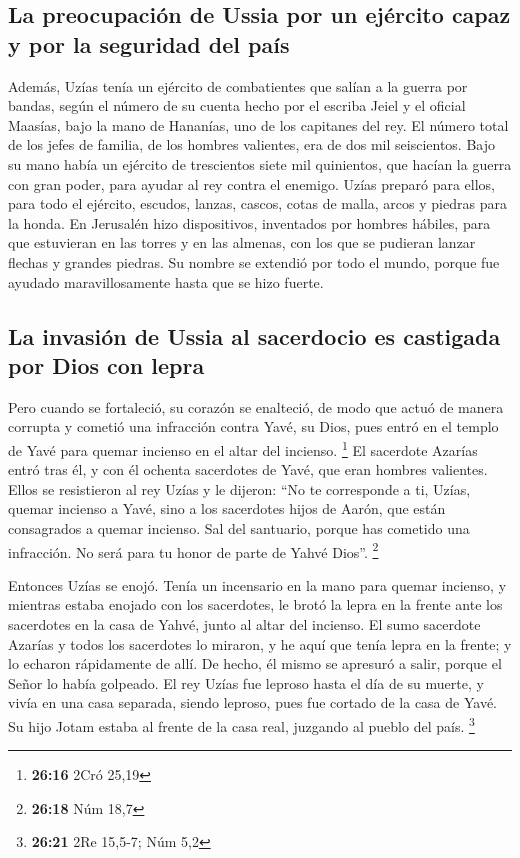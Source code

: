 \begin{paracol}{2}
{\subsection{La preocupación de Ussia por un ejército capaz y por la
seguridad del
país}\label{la-preocupaciuxf3n-de-ussia-por-un-ejuxe9rcito-capaz-y-por-la-seguridad-del-pauxeds}}

 Además, Uzías tenía un ejército de combatientes que
salían a la guerra por bandas, según el número de su cuenta hecho por el
escriba Jeiel y el oficial Maasías, bajo la mano de Hananías, uno de los
capitanes del rey.  El número total de los jefes de
familia, de los hombres valientes, era de dos mil seiscientos.
 Bajo su mano había un ejército de trescientos siete mil
quinientos, que hacían la guerra con gran poder, para ayudar al rey
contra el enemigo.  Uzías preparó para ellos, para todo
el ejército, escudos, lanzas, cascos, cotas de malla, arcos y piedras
para la honda.  En Jerusalén hizo dispositivos,
inventados por hombres hábiles, para que estuvieran en las torres y en
las almenas, con los que se pudieran lanzar flechas y grandes piedras.
Su nombre se extendió por todo el mundo, porque fue ayudado
maravillosamente hasta que se hizo fuerte.

\hypertarget{la-invasiuxf3n-de-ussia-al-sacerdocio-es-castigada-por-dios-con-lepra}{%
\subsection{La invasión de Ussia al sacerdocio es castigada por Dios con
lepra}\label{la-invasiuxf3n-de-ussia-al-sacerdocio-es-castigada-por-dios-con-lepra}}

 Pero cuando se fortaleció, su corazón se enalteció, de
modo que actuó de manera corrupta y cometió una infracción contra Yavé,
su Dios, pues entró en el templo de Yavé para quemar incienso en el
altar del incienso. \footnote{\textbf{26:16} 2Cró 25,19} 
El sacerdote Azarías entró tras él, y con él ochenta sacerdotes de Yavé,
que eran hombres valientes.  Ellos se resistieron al rey
Uzías y le dijeron: ``No te corresponde a ti, Uzías, quemar incienso a
Yavé, sino a los sacerdotes hijos de Aarón, que están consagrados a
quemar incienso. Sal del santuario, porque has cometido una infracción.
No será para tu honor de parte de Yahvé Dios''. \footnote{\textbf{26:18}
  Núm 18,7}

 Entonces Uzías se enojó. Tenía un incensario en la mano
para quemar incienso, y mientras estaba enojado con los sacerdotes, le
brotó la lepra en la frente ante los sacerdotes en la casa de Yahvé,
junto al altar del incienso.  El sumo sacerdote Azarías y
todos los sacerdotes lo miraron, y he aquí que tenía lepra en la frente;
y lo echaron rápidamente de allí. De hecho, él mismo se apresuró a
salir, porque el Señor lo había golpeado.  El rey Uzías
fue leproso hasta el día de su muerte, y vivía en una casa separada,
siendo leproso, pues fue cortado de la casa de Yavé. Su hijo Jotam
estaba al frente de la casa real, juzgando al pueblo del país.
\footnote{\textbf{26:21} 2Re 15,5-7; Núm 5,2}


\end{paracol}
